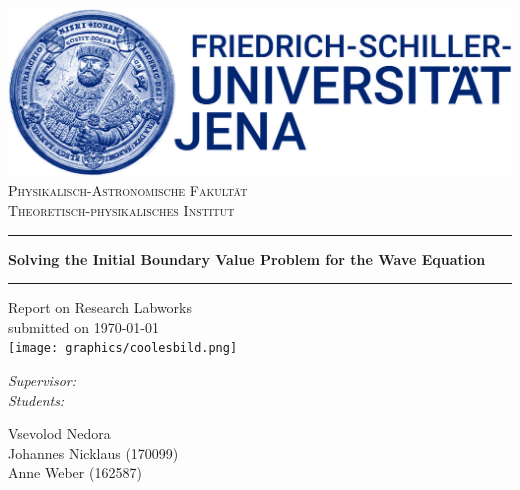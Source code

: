 \documentclass[a4paper,headsepline,12pt,oneside]{scrartcl}
\begin{document}
\begin{titlepage}

\thispagestyle{empty}
    \makeatletter
    \centering
    \includegraphics[scale = 0.2]{graphics/fsulogo.jpg}\\[1.0 cm]
    \textsc{\Large Physikalisch-Astronomische Fakultät\\Theoretisch-physikalisches Institut}
    \vspace{1cm} \hrule \vspace{0.4cm}
    \Large \textbf{Solving the Initial Boundary Value Problem for the Wave Equation}
    \vspace{0.4cm} \hrule \vspace{1cm}
    \Large Report on Research Labworks \\
    submitted on \today \\
    \vspace{1cm}
    {\centering
    \texttt{[image: graphics/coolesbild.png]}}\\

    \begin{minipage}[t]{0.4\textwidth}
        \begin{flushright} \large
            \emph{Supervisor:}\\
            \emph{Students:}
         \end{flushright}
    \end{minipage}%
    \hspace{0.5cm}
    \begin{minipage}[t]{0.4\textwidth}
    \begin{flushleft} \large
          Vsevolod Nedora \\
          Johannes Nicklaus (170099) \\ Anne Weber (162587)
    \end{flushleft}
    \end{minipage}\\[2 cm]
    \makeatother
\end{titlepage}
\end{document}
